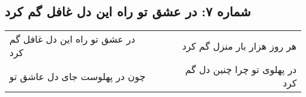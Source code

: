 \begin{center}
\section*{شماره ۷: در عشق تو راه این دل غافل گم کرد}
\label{sec:007}
\begin{longtable}{l p{0.5cm} r}
در عشق تو راه این دل غافل گم کرد
&&
هر روز هزار بار منزل گم کرد
\\
چون در پهلوست جای دل عاشق تو
&&
در پهلوی تو چرا چنین دل گم کرد
\\
\end{longtable}
\end{center}
